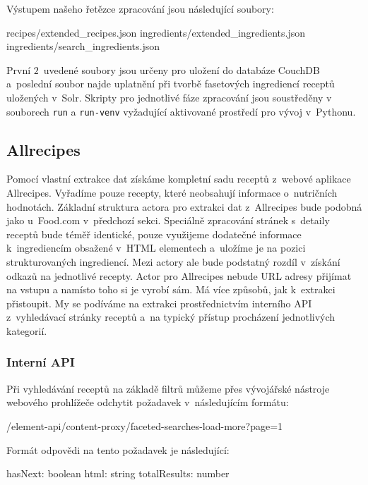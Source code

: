 Výstupem našeho řetězce zpracování jsou následující soubory:

\begin{code}
recipes/extended_recipes.json
ingredients/extended_ingredients.json
ingredients/search_ingredients.json
\end{code}

První $2$~uvedené soubory jsou určeny pro uložení do databáze CouchDB a~poslední soubor najde uplatnění při tvorbě fasetových ingrediencí receptů uložených v~Solr. Skripty pro jednotlivé fáze zpracování jsou soustředěny v souborech \texttt{run} a \texttt{run-venv} vyžadující aktivované prostředí pro vývoj v~Pythonu.

\subsection{Allrecipes}

Pomocí vlastní extrakce dat získáme kompletní sadu receptů z~webové aplikace Allrecipes. Vyřadíme pouze recepty, které neobsahují informace o~nutričních hodnotách. Základní struktura actora pro extrakci dat z~Allrecipes bude podobná jako u~Food.com v~předchozí sekci. Speciálně zpracování stránek s~detaily receptů bude téměř identické, pouze využijeme dodatečné informace k~ingrediencím obsažené v~HTML elementech a~uložíme je na pozici strukturovaných ingrediencí. Mezi actory ale bude podstatný rozdíl v~získání odkazů na jednotlivé recepty. Actor pro Allrecipes nebude URL adresy přijímat na vstupu a namísto toho si je vyrobí sám. Má více způsobů, jak k~extrakci přistoupit. My se podíváme na extrakci prostřednictvím interního API z~vyhledávací stránky receptů a~na typický přístup procházení jednotlivých kategorií.

\subsubsection{Interní API}

Při vyhledávání receptů na základě filtrů můžeme přes vývojářské nástroje webového prohlížeče odchytit požadavek v~následujícím formátu:

\begin{code}
/element-api/content-proxy/faceted-searches-load-more?page=1
\end{code}
Formát odpovědi na tento požadavek je následující:
\begin{code}
{
    hasNext: boolean
    html: string
    totalResults: number
}
\end{code}

